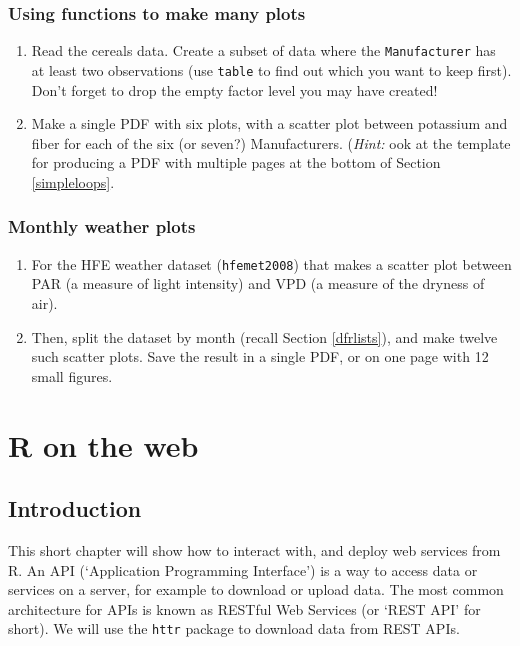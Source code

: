 \documentclass[]{book}
\begin{document}
\hypertarget{using-functions-to-make-many-plots}{%
\subsection{Using functions to make many plots}\label{using-functions-to-make-many-plots}}

\begin{enumerate}
\def\labelenumi{\arabic{enumi}.}
\item
  Read the cereals data. Create a subset of data where the \texttt{Manufacturer} has at least two observations (use \texttt{table} to find out which you want to keep first). Don't forget to drop the empty factor level you may have created!
\item
  Make a single PDF with six plots, with a scatter plot between potassium and fiber for each of the six (or seven?) Manufacturers. (\emph{Hint:} ook at the template for producing a PDF with multiple pages at the bottom of Section \ref{simpleloops}.
\end{enumerate}

\hypertarget{monthly-weather-plots}{%
\subsection{Monthly weather plots}\label{monthly-weather-plots}}

\begin{enumerate}
\def\labelenumi{\arabic{enumi}.}
\item
  For the HFE weather dataset (\texttt{hfemet2008}) that makes a scatter plot between PAR (a measure of light intensity) and VPD (a measure of the dryness of air).
\item
  Then, split the dataset by month (recall Section \ref{dfrlists}), and make twelve such scatter plots. Save the result in a single PDF, or on one page with 12 small figures.
\end{enumerate}

\hypertarget{webservices}{%
\chapter{R on the web}\label{webservices}}

\hypertarget{introduction-4}{%
\section{Introduction}\label{introduction-4}}

This short chapter will show how to interact with, and deploy web services from R. An API (`Application Programming Interface') is a way to access data or services on a server, for example to download or upload data. The most common architecture for APIs is known as RESTful Web Services (or `REST API' for short). We will use the \texttt{httr} package to download data from REST APIs.
\end{document}
